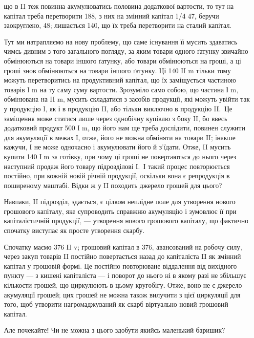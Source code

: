 \parcont{}  %
що в II теж повинна акумулюватись половина додаткової вартости,
то тут на капітал треба перетворити 188, з них на змінний капітал
1/4 \deq{} 47, беручи заокруглено, 48; лишається 140, що їх треба
перетворити на сталий капітал.

Тут ми натрапляємо на нову проблему, що саме існування її мусить
здаватись чимсь дивним з того загального погляду, за яким
товари одного ґатунку звичайно обмінюються на товари іншого ґатунку,
або товари обмінюються на гроші, а ці гроші знов обмінюються на
товари іншого ґатунку. Ці 140 II m тільки тому можуть перетворитись
на продуктивний капітал, що їх заміщується частиною товарів І m на
ту саму суму вартости. Зрозуміло само собою, що частина І m, обмінювана
на II m, мусить складатися з засобів продукції, які можуть
увійти так у продукцію І, як і в продукцію II, або тільки виключно
в продукцію II.~Це заміщення може статися лише через
однобічну купівлю з боку II, бо ввесь додатковий продукт 500 І m, що
його нам ще треба дослідити, повинен служити для акумуляції в межах І,
отже, його не можна обміняти на товари II; інакше кажучи, І не може
одночасно і акумулювати його й з’їдати. Отже, II мусить купити 140 І m
за готівку, при чому ці гроші не повертаються до нього через наступний
продаж його товару підрозділові І.~І такий процес повторюється постійно,
при кожній новій річній продукції, оскільки вона є репродукція в поширеному
маштабі. Відки ж у II походить джерело грошей для цього?

Навпаки, II підрозділ, здається, є цілком неплідне поле для утворення
нового грошового капіталу, яке супроводить справжню акумуляцію і
зумовлює її при капіталістичній продукції, — утворення нового грошового
капіталу, що фактично спочатку виступає як просте утворення
скарбу.

Спочатку маємо 376 II v; грошовий капітал в 376, авансований на
робочу силу, через закуп товарів II постійно повертається назад до
капіталіста II як змінний капітал у грошовій формі. Це постійно повторюване
віддалення від вихідного пункту — з кишені капіталіста — і поворот
до нього ні в якому разі не збільшує кількости грошей, що
циркулюють в цьому кругобігу. Отже, воно не є джерело акумуляції
грошей; цих грошей не можна також вилучити з цієї циркуляції для
того, щоб утворити нагромаджуваний як скарб віртуально новий грошовий
капітал.

Але почекайте! Чи не можна з цього здобути якийсь маленький
баришик?

